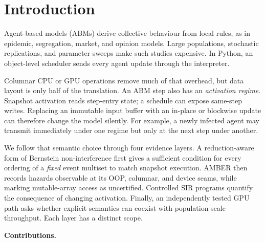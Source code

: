 \documentclass[sigconf,nonacm,review,natbib=true]{acmart}
\theoremstyle{definition}
\theoremstyle{plain}
\theoremstyle{remark}
\begin{document}


\maketitle



\section{Introduction}

Agent-based models (ABMs) derive collective behaviour from local rules, as in
epidemic, segregation, market, and opinion models. Large populations,
stochastic replications, and parameter sweeps make such studies expensive. In
Python, an object-level scheduler sends every agent update through the
interpreter.

Columnar CPU or GPU operations remove much of that overhead, but data layout is
only half of the translation. An ABM step also has an \emph{activation regime}.
Snapshot activation reads step-entry state; a schedule can expose same-step
writes. Replacing an immutable input buffer with an in-place
or blockwise update can therefore change the model silently. For example, a
newly infected agent may transmit immediately under one regime but only at the
next step under another.

We follow that semantic choice through four evidence layers. A reduction-aware
form of Bernstein non-interference first gives a sufficient condition for every
ordering of a \emph{fixed} event multiset to match snapshot execution. AMBER
then records hazards observable at its OOP, columnar, and device seams, while
marking mutable-array access as uncertified. Controlled SIR programs quantify
the consequence of changing activation. Finally, an independently tested GPU
path asks whether explicit semantics can coexist with population-scale
throughput. Each layer has a distinct scope.

\textbf{Contributions.}
\end{document}
